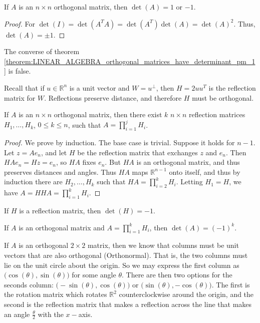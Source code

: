 \documentclass[../main.tex]{subfiles}
\begin{document}
%
\begin{theorem}
\label{theorem:LINEAR_ALGEBRA_orthogonal_matrices_have_determinant_pm_1}
If $A$ is an $n\times n$ orthogonal matrix, then $\det(A) = 1$ or $-1$.
\end{theorem}
\begin{proof}
For $\det(I) = \det(A^TA) = \det(A^T)\det(A) = \det(A)^2$. Thus, $\det(A) = \pm 1$.
\end{proof}
%
\begin{remark}
The converse of theorem \ref{theorem:LINEAR_ALGEBRA_orthogonal_matrices_have_determinant_pm_1} is false.
\end{remark}
%
Recall that if $u\in \mathbb{R}^n$ is a unit vector and $W = u^{\perp}$, then $H=2uu^T$ is the reflection matrix for $W$. Reflections preserve distance, and therefore $H$ must be orthogonal. 
%
\begin{theorem}
If $A$ is an $n\times n$ orthogonal matrix, then there exist $k$ $n\times n$ reflection matrices $H_1,\hdots, H_k$, $0\leq k \leq n$, such that $A = \prod_{i=1}^{j}H_i$.
\end{theorem}
\begin{proof}
We prove by induction. The base case is trivial. Suppose it holds for $n-1$. Let $z = Ae_n$, and let $H$ be the reflection matrix that exchanges $z$ and $e_n$. Then $HAe_n = Hz = e_n$, so $HA$ fixes $e_n$. But $HA$ is an orthogonal matrix, and thus preserves distances and angles. Thus $HA$ maps $\mathbb{R}^{n-1}$ onto itself, and thus by induction there are $H_2,\hdots, H_k$ such that $HA = \prod_{i=2}^{k} H_i$. Letting $H_{1}=H$, we have $A = HHA = \prod_{i=1}^{k}H_i$.
\end{proof}
%
\begin{theorem}
If $H$ is a reflection matrix, then $\det(H) = -1$.
\end{theorem}
%
\begin{theorem}
If $A$ is an orthogonal matrix and $A=\prod_{i=1}^{k} H_i$, then $\det(A) = (-1)^k$.
\end{theorem}
%
If $A$ is an orthogonal $2\times 2$ matrix, then we know that columns must be unit vectors that are also orthogonal (Orthonormal). That is, the two columns must lie on the unit circle about the origin. So we may express the first column as $\big(\cos(\theta),\sin(\theta)\big)$ for some angle $\theta$. There are then two options for the seconds column: $\big(-\sin(\theta),\cos(\theta)\big)$ or $\big(\sin(\theta),-\cos(\theta)\big)$. The first is the rotation matrix which rotates $\mathbb{R}^2$ counterclockwise around the origin, and the second is the reflection matrix that makes a reflection across the line that makes an angle $\frac{\theta}{2}$ with the $x-$axis. 
\end{document}

